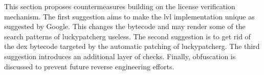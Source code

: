 This section proposes countermeasures building on the license verification mechanism.
\newline
The first suggestion aims to make the \gls{lvl} implementation unique as suggested by Google.
This changes the bytecode and may render some of the search patterns of \gls{luckypatcherg} useless.
\newline
The second suggestion is to get rid of the dex bytecode targeted by the automatic patching of \gls{luckypatcherg}.
\newline
The third suggestion introduces an additional layer of checks.
\newline
Finally, obfuscation is discussed to prevent future reverse engineering efforts.
